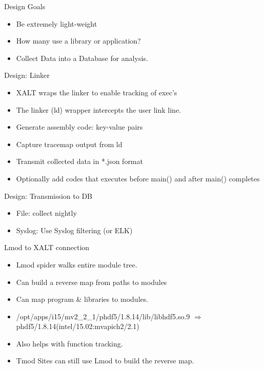 \documentclass{beamer}
\begin{document}
\begin{frame}{Design Goals}
  \begin{itemize}
    \item Be extremely light-weight
    \item How many use a library or application?
    \item Collect Data into a Database for analysis.
  \end{itemize}
\end{frame}

\begin{frame}{Design: Linker}
  \begin{itemize}
    \item XALT wraps the linker to enable tracking of exec's
    \item The linker (ld) wrapper intercepts the user link line.
    \item Generate assembly code: key-value pairs
    \item Capture tracemap output from ld
    \item Transmit collected data in *.json format
    \item Optionally add codes that executes before main() and after main() completes
  \end{itemize}
\end{frame}

\begin{frame}{Design: Transmission to DB}
  \begin{itemize}
    \item File: collect nightly
    \item Syslog: Use Syslog filtering (or ELK)
  \end{itemize}
\end{frame}

\begin{frame}{Lmod to XALT connection}
  \begin{itemize}
    \item Lmod spider walks entire module tree.
    \item Can build a reverse map from paths to modules
    \item Can map program \& libraries to modules.
    \item /opt/apps/i15/mv2\_2\_1/phdf5/1.8.14/lib/libhdf5.so.9
      $\Rightarrow$ phdf5/1.8.14(intel/15.02:mvapich2/2.1)
    \item Also helps with function tracking.
    \item Tmod Sites can still use Lmod to build the reverse map.
  \end{itemize}
\end{frame}
\end{document}
